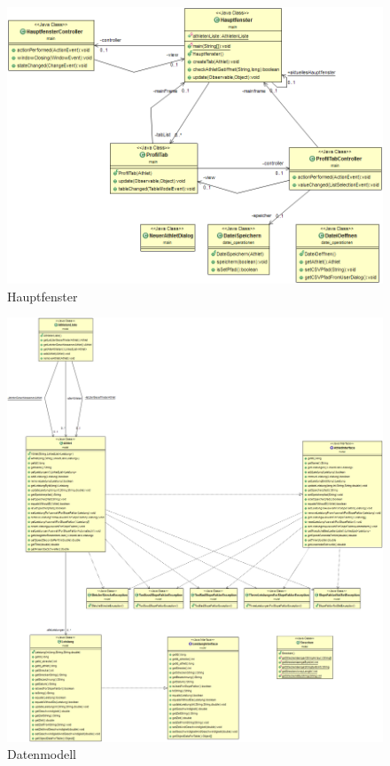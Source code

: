 \documentclass{article}
\begin{document}
\begin{figure}
    \centering
    \includegraphics[width=6.0in]{../_diagrams/Main.png}
    \caption{Hauptfenster}
    \label{main}
\end{figure}


\begin{figure}
    \centering
    \includegraphics[width=6.0in]{../_diagrams/model.png}
    \caption{Datenmodell}
    \label{model}
\end{figure}
\end{document}
